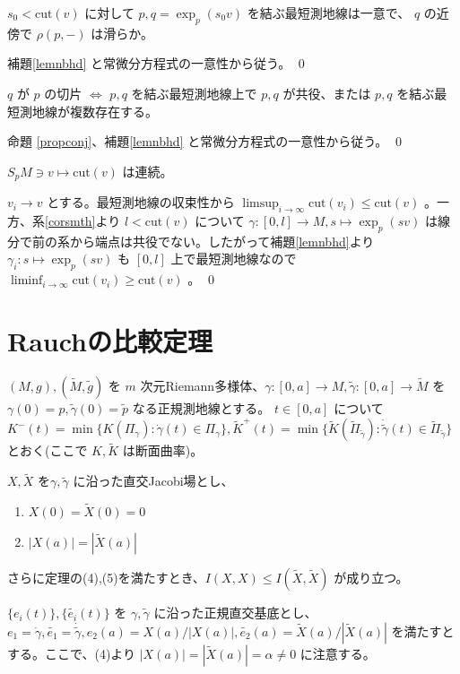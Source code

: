 \documentclass[dvipdfmx,a4paper]{jsreport}
\theoremstyle{definition}
\renewcommand{\tilde}{\widetilde}
\begin{document}
\cor\label{corsmth} $s_0<\mbox{cut}(v)$ に対して $p,q=\exp_p(s_0v)$ を結ぶ最短測地線は一意で、 $q$ の近傍で $\rho(p,-)$ は滑らか。

\prf 補題\ref{lemnbhd} と常微分方程式の一意性から従う。 \qed

\cor $q$ が $p$ の切片 $\iff$ $p,q$ を結ぶ最短測地線上で $p,q$ が共役、または $p,q$ を結ぶ最短測地線が複数存在する。

\prf 命題 \ref{propconj}、補題\ref{lemnbhd} と常微分方程式の一意性から従う。 \qed

\lem $S_pM \ni v \mapsto \mbox{cut}(v)$ は連続。

\prf $v_i \to v$ とする。最短測地線の収束性から $\limsup_{i \to \infty} \mbox{cut}(v_i) \leq \mbox{cut}(v)$ 。一方、系\ref{corsmth}より $l<\mbox{cut}(v)$ について $\gamma:[0,l] \to M,s \mapsto \exp_p(sv)$ は線分で前の系から端点は共役でない。したがって補題\ref{lemnbhd}より $\gamma_i:s \mapsto \exp_p(sv)$ も $[0,l]$ 上で最短測地線なので $\liminf_{i \to \infty} \mbox{cut}(v_i) \geq \mbox{cut}(v)$ 。 \qed

\section{Rauchの比較定理}

$(M,g),(\tilde{M},\tilde{g})$ を $m$ 次元Riemann多様体、$\gamma:[0,a] \to M,\tilde{\gamma}:[0,a] \to \tilde{M}$ を $\gamma(0)=p,\tilde{\gamma}(0)=\tilde{p}$ なる正規測地線とする。 $t \in [0,a]$ について $K^-(t)=\min\{K(\Pi_{\gamma}) \colon \dot{\gamma}(t) \in \Pi_{\gamma}\},\tilde{K}^+(t)=\min\{\tilde{K}(\tilde{\Pi}_{\tilde{\gamma}}) \colon \dot{\tilde{\gamma}}(t) \in \tilde{\Pi}_{\tilde{\gamma}}\}$ とおく(ここで $K,\tilde{K}$ は断面曲率)。

\lem $X,\tilde{X}$ を$\gamma,\tilde{\gamma}$ に沿った直交Jacobi場とし、
\begin{enumerate}
    \item $X(0)=\tilde{X}(0)=0$ 
    \item $|X(a)|=|\tilde{X}(a)|$
\end{enumerate}

さらに定理の(4),(5)を満たすとき、$I(X,X)\leq I(\tilde{X},\tilde{X})$ が成り立つ。

\prf $\{e_i(t)\},\{\tilde{e_i}(t)\}$ を $\gamma,\tilde{\gamma}$ に沿った正規直交基底とし、$e_1=\dot{\gamma},\tilde{e_1}=\dot{\tilde{\gamma}},e_2(a)=X(a)/|X(a)|,\tilde{e_2}(a)=\tilde{X}(a)/|\tilde{X}(a)|$ を満たすとする。ここで、(4)より $|X(a)|=|\tilde{X}(a)|=\alpha \neq 0$ に注意する。
\end{document}

